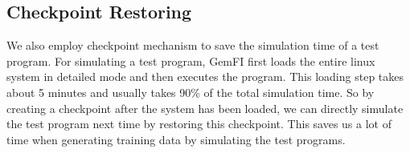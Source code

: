 \subsection{Checkpoint Restoring}
We also employ checkpoint mechanism to save the simulation time of a test program. For simulating a test program, GemFI first loads the entire linux system in detailed mode and then executes the program. This loading step takes about 5 minutes and usually takes 90\% of the total simulation time. So by creating a checkpoint after the system has been loaded, we can directly simulate the test program next time by restoring this checkpoint. This saves us a lot of time when generating training data by simulating the test programs. 



